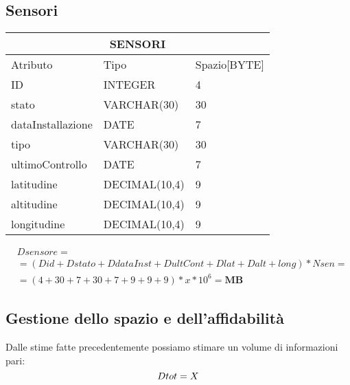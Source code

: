 \subsection{Sensori}
\begin{tabular}{ |p{3cm}|p{3cm}|p{3cm}|}
 \hline
 \multicolumn{3}{|c|}{\textbf{SENSORI}}\\
 \hline
Atributo & Tipo & Spazio[BYTE] \\
 \hline
ID & INTEGER & 4 \\
stato & VARCHAR(30) & 30\\
dataInstallazione & DATE & 7\\
tipo & VARCHAR(30) & 30\\
ultimoControllo & DATE & 7\\
latitudine & DECIMAL(10,4) & 9\\
altitudine & DECIMAL(10,4) & 9\\
longitudine & DECIMAL(10,4) & 9\\
 \hline
\end{tabular}
\begin{equation}
\begin{aligned}
&Dsensore =\\
&=(Did+Dstato+DdataInst+DultCont+Dlat+Dalt+long)*Nsen=\\
&=(4+30+7+30+7+9+9+9)*x*10^6= \textbf{MB}
\end{aligned}
\end{equation}
\subsection{\textbf{Gestione dello spazio e dell'affidabilità}}
Dalle stime fatte precedentemente possiamo stimare un volume di informazioni pari:
\begin{equation}
Dtot=X\\
\end{equation}
